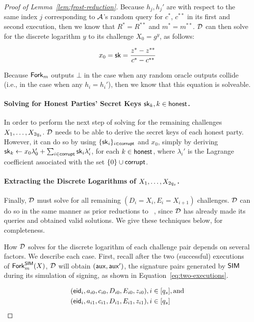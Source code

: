 \begin{proof}[Proof of Lemma~\ref{lem:frost-reduction}]
  Because $h_j, h_j'$ are with respect to the same index $j$ corresponding to
  $\mathcal{A}$'s random query for $c^*$, $c^{**}$ in its first and second execution,
  then we know that $R^{*}=R^{**}$ and $m^{*}=m^{**}$.
   $\mathcal{D}$ can then solve for the discrete logarithm $y$ to its challenge $X_0 = g^y$,
   as follows:

   \begin{equation}
     x_0 = \mathsf{sk} =  \frac{z^* - z^{**}}{c^* - c^{**}}
   \end{equation}

   Because $\mathsf{Fork}_m$ outputs $\bot$ in the case when any random oracle outputs collide (i.e., in the case when any $h_i = h_i'$),
   then we know that this equation is solveable.

 \paragraph{Solving for Honest Parties' Secret Keys $\mathsf{sk}_k, k \in \mathsf{honest}$.}
 In order to perform the next step of solving for the remaining \AOMDL challenges
  $X_1, \ldots, X_{2q_s}$.
 $\mathcal{D}$ needs to be able to derive the secret keys of each honest party.
  However, it can do so by using $\{ \mathsf{sk}_i \}_{i \in \mathsf{corrupt}}$ and $x_0$,
  simply by deriving
  $\mathsf{sk}_k \gets x_0 \lambda_0' + \sum_{i \in \mathsf{corrupt}} \mathsf{sk}_i \lambda_i'$,
  for each $k \in \mathsf{honest}$,
  where $\lambda_i'$ is the Lagrange coefficient associated with the set $\{ 0\} \cup \mathsf{corrupt}$.


 \paragraph{Extracting the Discrete Logarithms of $X_1, \ldots, X_{2q_s}$.}
  Finally, $\mathcal{D}$ must solve for all remaining $(D_i=X_i, E_i=X_{i+1})$ \AOMDL challenges.
  $\mathcal{D}$ can do so in the same manner as prior reductions to \OMDL~\cite{BellareCKMTZ22},
  since $\mathcal{D}$ has already made its \AOMDL queries and obtained valid solutions.
  We give these techniques below, for completeness.


  How $\mathcal{D}$ solves for the discrete logarithm of each challenge pair depends on several factors.
  We describe each case.
  First,
  recall after the two (successful) executions of $\mathsf{Fork}_m^{\mathsf{SIM}}(X)$,
  $\mathcal{D}$ will obtain $(\mathsf{aux}, \mathsf{aux}')$,
  the signature pairs generated by $\mathsf{SIM}$ during its simulation of signing,
  as shown in Equation~\ref{eq:two-executions}.

  \begin{align} \label{eq:two-executions}
    \begin{split}
      & (\mathsf{eid}_i, a_{i0}, c_{i0}, D_{i0}, E_{i0},  z_{i0}), i \in  [q_s],  \text{and} \\
      & (\mathsf{eid}_i, a_{i1}, c_{i1},  D_{i1}, E_{i1}, z_{i1}), i \in [q_s] \\
    \end{split}
\end{align}



\end{proof}
